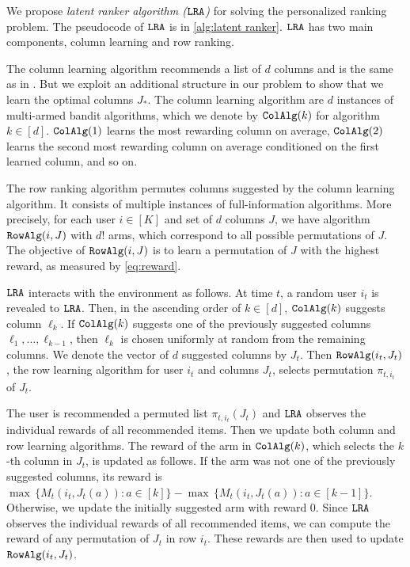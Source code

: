 

We propose \emph{latent ranker algorithm (${\tt LRA}$)} for solving the personalized ranking problem. The pseudocode of ${\tt LRA}$ is in \cref{alg:latent ranker}. ${\tt LRA}$ has two main components, column learning and row ranking.

The column learning algorithm recommends a list of $d$ columns and is the same as in \citet{radlinski2008learning}. But we exploit an additional structure in our problem to show that we learn the optimal columns $J_\ast$. The column learning algorithm are $d$ instances of multi-armed bandit algorithms, which we denote by ${\tt ColAlg}(k)$ for algorithm $k \in [d]$. ${\tt ColAlg}(1)$ learns the most rewarding column on average, ${\tt ColAlg}(2)$ learns the second most rewarding column on average conditioned on the first learned column, and so on.

The row ranking algorithm permutes columns suggested by the column learning algorithm. It consists of multiple instances of full-information algorithms. More precisely, for each user $i \in [K]$ and set of $d$ columns $J$, we have algorithm ${\tt RowAlg}(i, J)$ with $d!$ arms, which correspond to all possible permutations of $J$. The objective of ${\tt RowAlg}(i, J)$ is to learn a permutation of $J$ with the highest reward, as measured by \eqref{eq:reward}.

${\tt LRA}$ interacts with the environment as follows. At time $t$, a random user $i_t$ is revealed to ${\tt LRA}$. Then, in the ascending order of $k \in [d]$, ${\tt ColAlg}(k)$ suggests column $\ell_k$. If ${\tt ColAlg}(k)$ suggests one of the previously suggested columns $\ell_1, \dots, \ell_{k - 1}$, then $\ell_k$ is chosen uniformly at random from the remaining columns. We denote the vector of $d$ suggested columns  by $J_t$. Then ${\tt RowAlg}(i_t, J_t)$, the row learning algorithm for user $i_t$ and columns $J_t$, selects permutation $\pi_{t, i_t}$ of $J_t$.

The user is recommended a permuted list $\pi_{t, i_t}(J_t)$ and ${\tt LRA}$ observes the individual rewards of all recommended items. Then we update both column and row learning algorithms. The reward of the arm in ${\tt ColAlg}(k)$, which selects the $k$-th column in $J_t$, is updated as follows. If the arm was not one of the previously suggested columns, its reward is $\max \, \{M_t(i_t, J_t(a)): a \in [k]\} - \max \, \{M_t(i_t, J_t(a)): a \in [k - 1]\}$. Otherwise, we update the initially suggested arm with reward $0$. Since ${\tt LRA}$ observes the individual rewards of all recommended items, we can compute the reward of any permutation of $J_t$ in row $i_t$. These rewards are then used to update ${\tt RowAlg}(i_t, J_t)$. 

